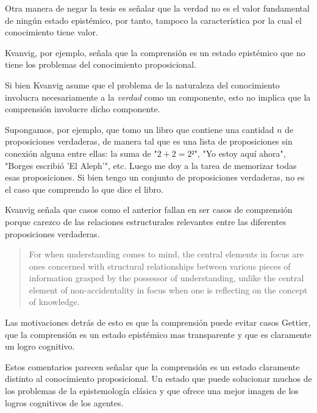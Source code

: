 {Otra manera de negar la tesis es señalar que la verdad no es el valor fundamental de ningún estado epistémico, por tanto, tampoco la característica por la cual el conocimiento tiene valor.

Kvanvig, por ejemplo, señala que la comprensión es un estado epistémico que no tiene los problemas del conocimiento proposicional.

Si bien Kvanvig asume que el problema de la naturaleza del conocimiento involucra necesariamente a la \emph{verdad} como un componente, esto no implica que la comprensión involucre dicho componente.

Supongamos, por ejemplo, que tomo un libro que contiene una cantidad $n$ de proposiciones verdaderas, de manera tal que es una lista de proposiciones sin conexión alguna entre ellas: la suma de "$2+2 = 2²$", "Yo estoy aquí ahora", "Borges escribió 'El Aleph'", etc.
Luego me doy a la tarea de memorizar todas esas proposiciones.
Si bien tengo un conjunto de proposiciones verdaderas, no es el caso que comprendo lo que dice el libro.

Kvanvig señala que casos como el anterior fallan en ser casos de comprensión porque carezco de las relaciones estructurales relevantes entre las diferentes proposiciones verdaderas.

\begin{quote}
     For when understanding comes to mind, the central elements in focus are ones concerned with structural relationships between various pieces of information grasped by the possessor of understanding, unlike the central element of non-accidentality in focus when one is reflecting on the concept of knowledge. %
\end{quote}

Las motivaciones detrás de esto es que la comprensión puede evitar casos Gettier, que la comprensión es un estado epistémico mas transparente y que es claramente un logro cognitivo.

Estos comentarios parecen señalar que la comprensión es un estado claramente distinto al conocimiento proposicional.
Un estado que puede solucionar muchos de los problemas de la epistemología clásica y que ofrece una mejor imagen de los logros cognitivos de los agentes.

}
